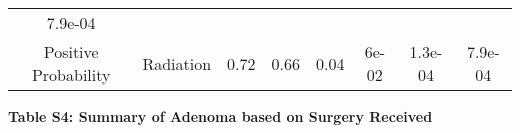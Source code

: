\documentclass[12pt,]{article}
\begin{document}
\begin{longtable}[]{@{}cccccccc@{}}
\begin{minipage}[t]{0.08\columnwidth}
7.9e-04\strut
\end{minipage}\tabularnewline
\begin{minipage}[t]{0.12\columnwidth}\centering\strut
Positive Probability\strut
\end{minipage} & \begin{minipage}[t]{0.11\columnwidth}\centering\strut
Radiation\strut
\end{minipage} & \begin{minipage}[t]{0.13\columnwidth}\centering\strut
0.72\strut
\end{minipage} & \begin{minipage}[t]{0.08\columnwidth}\centering\strut
0.66\strut
\end{minipage} & \begin{minipage}[t]{0.13\columnwidth}\centering\strut
0.04\strut
\end{minipage} & \begin{minipage}[t]{0.07\columnwidth}\centering\strut
6e-02\strut
\end{minipage} & \begin{minipage}[t]{0.06\columnwidth}\centering\strut
1.3e-04\strut
\end{minipage} & \begin{minipage}[t]{0.08\columnwidth}\centering\strut
7.9e-04\strut
\end{minipage}\tabularnewline
\bottomrule
\end{longtable}

\normalsize

\newpage

\textbf{Table S4: Summary of Adenoma based on Surgery Received}
\end{document}
